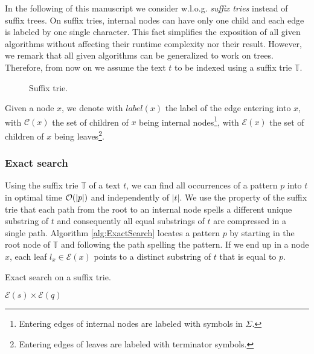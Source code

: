 In the following of this manuscript we consider w.l.o.g. \emph{suffix tries} instead of suffix trees.
On suffix tries, internal nodes can have only one child and each edge is labeled by one single character.
This fact simplifies the exposition of all given algorithms without affecting their runtime complexity nor their result.
However, we remark that all given algorithms can be generalized to work on trees.
Therefore, from now on we assume the text $t$ to be indexed using a suffix trie $\mathbb{T}$.

\begin{figure}[h]
\caption{Suffix trie.}
\label{fig:strie}
\end{figure}

Given a node $x$, we denote with $label(x)$ the label of the edge entering into $x$, with $\mathcal{C}(x)$ the set of children of $x$ being internal nodes\footnote{Entering edges of internal nodes are labeled with symbols in $\Sigma$.}, with $\mathcal{E}(x)$ the set of children of $x$ being leaves\footnote{Entering edges of leaves are labeled with terminator symbols.}.

\subsubsection{Exact search}

Using the suffix trie $\mathbb{T}$ of a text $t$, we can find all occurrences of a pattern $p$ into $t$ in optimal time $\mathcal{O}(|p|)$ and independently of $|t|$.
We use the property of the suffix trie that each path from the root to an internal node spells a different unique substring of $t$ and consequently all equal substrings of $t$ are compressed in a single path.
Algorithm \ref{alg:ExactSearch} locates a pattern $p$ by starting in the root node of $\mathbb{T}$ and following the path spelling the pattern.
If we end up in a node $x$, each leaf $l_x \in \mathcal{E}(x)$ points to a distinct substring of $t$ that is equal to $p$.

\begin{algorithm}
\caption{Exact search on a suffix trie.}
\label{alg:st-exact}
\begin{algorithmic}[1]
	\State \Report $\mathcal{E}(s) \times \mathcal{E}(q)$
			\State {}
		\EndIf
	\EndFor
\EndProcedure
\end{algorithmic}
\end{algorithm}

